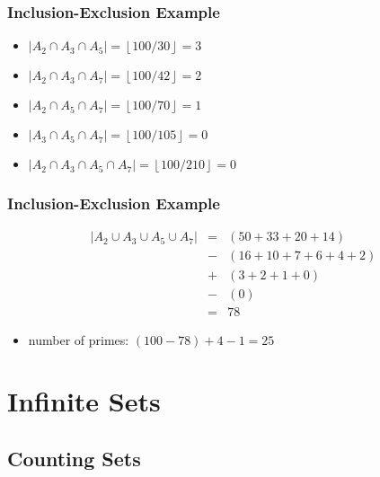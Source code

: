 \documentclass[dvipsnames]{beamer}
\begin{document}
\begin{frame}
  \frametitle{Inclusion-Exclusion Example}

  \begin{itemize}
    \item $|A_2 \cap A_3 \cap A_5| = \left\lfloor 100/30  \right\rfloor = 3$
    \item $|A_2 \cap A_3 \cap A_7| = \left\lfloor 100/42  \right\rfloor = 2$
    \item $|A_2 \cap A_5 \cap A_7| = \left\lfloor 100/70  \right\rfloor = 1$
    \item $|A_3 \cap A_5 \cap A_7| = \left\lfloor 100/105 \right\rfloor = 0$
  \end{itemize}

  \pause
  \begin{itemize}
    \item $|A_2 \cap A_3 \cap A_5 \cap A_7| = \left\lfloor 100/210 \right\rfloor = 0$
  \end{itemize}
\end{frame}

\begin{frame}
  \frametitle{Inclusion-Exclusion Example}

  \begin{eqnarray*}
    |A_2 \cup A_3 \cup A_5 \cup A_7| & = & (50 + 33 + 20 +14)\\
                                      & - & (16 + 10 + 7 + 6 + 4 + 2)\\
                                      & + & (3 + 2 + 1 + 0)\\
                                      & - & (0)\\
                                      & = & 78
  \end{eqnarray*}

  \pause
  \begin{itemize}
    \item number of primes: $(100 - 78) + 4 - 1 = 25$
  \end{itemize}
\end{frame}

\section{Infinite Sets}

\subsection{Counting Sets}
\end{document}
